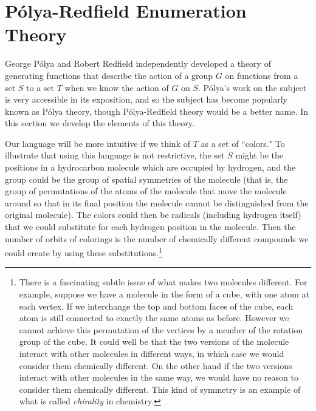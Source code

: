 \ep

\section{P\'olya-Redfield Enumeration Theory}
George P\'olya and Robert Redfield independently developed a theory of
generating functions that describe the action of a group $G$ on functions
from a set $S$ to a set $T$ when we know the action of $G$ on $S$.  P\'olya's
work on the subject is very accessible in its exposition, and so the
subject has become popularly known as P\'olya theory, though
P\'olya-Redfield theory would be a better name.  In this section we
develop the elements of this theory.


Our language will be more intuitive if we think of $T$ as a set of ``colors." 
To illustrate that using this language is not restrictive, the set $S$ might be
the positions in a hydrocarbon molecule which are occupied by hydrogen, and the
group could be the group of spatial symmetries of the molecule (that is, the group of
permutations of the atoms of the molecule that move the molecule around so that in its
final position the molecule cannot be distinguished from the original molecule).  
The colors could then be radicals (including hydrogen itself) that we could
substitute for each hydrogen position in the molecule.  Then the number of orbits
of colorings is the number of chemically different compounds we could create by
using these substitutions.\footnote{There is a fascinating subtle issue of what
makes two molecules different.  For example, suppose we have a molecule in the
form of a cube, with one atom at each vertex.  If we interchange the top and
bottom faces of the cube, each atom is still connected to exactly the same atoms
as before.   However we cannot achieve this permutation of the vertices by a
member of the rotation group of the cube.  It could well be that the two versions
of the molecule interact with other molecules in different ways, in which case we
would consider them chemically different.  On the other hand if the two versions
interact with other molecules in the same way, we would have no reason to
consider them chemically different.  This kind of symmetry is an example of what is
called {\em chirality} in chemistry.}

